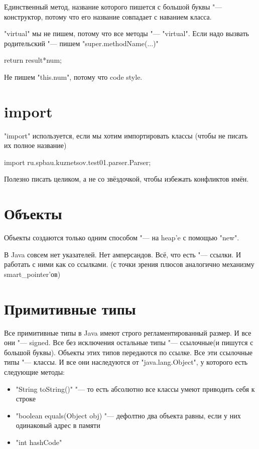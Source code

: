 Единственный метод, название которого пишется с большой буквы "--- 
конструктор, потому что его название совпадает с наванием класса.

\java"virtual" мы не пишем, потому что все методы "--- \java"virtual".
Если надо вызвать родительский "--- 
пишем \java"super.methodName(...)"

\begin{javacode}
return result*num;
\end{javacode}

Не пишем \java"this.num", потому что code style.





\section{import}
\java"import" используется, если мы хотим импортировать классы
(чтобы не писать их полное название)

\begin{javacode}
import ru.spbau.kuznetsov.test01.parser.Parser;
\end{javacode}

Полезно писать целиком, а не со звёздочкой, 
чтобы избежать конфликтов имён.





\section{Объекты}

Объекты создаются только одним способом "--- 
на heap'e с помощью \java"new".

В Java совсем нет указателей. Нет амперсандов. 
Всё, что есть "--- ссылки. И работать с ними как со ссылками.
(с точки зрения плюсов аналогично механизму smart\_pointer'ов)


\section{Примитивные типы}

Все примитивные типы в Java имеют строго регламентированный размер. 
И все они "--- signed.
Все без исключения остальные типы "--- 
ссылочные(и пишутся с большой буквы).
Объекты этих типов передаются по ссылке.
Все эти ссылочные типы "--- классы. И все они наследуются от 
\java"java.lang.Object", у которого есть следующие методы:

\begin{itemize}
		
	\item \java"String toString()" "--- 
		то есть абсолютно все классы умеют 
		приводить себя к строке

	\item \java"boolean equals(Object obj) "--- 
		дефолтно два объекта равны, 
		если у них одинаковый адрес в памяти

	\item \java"int hashCode"
\end{itemize}


